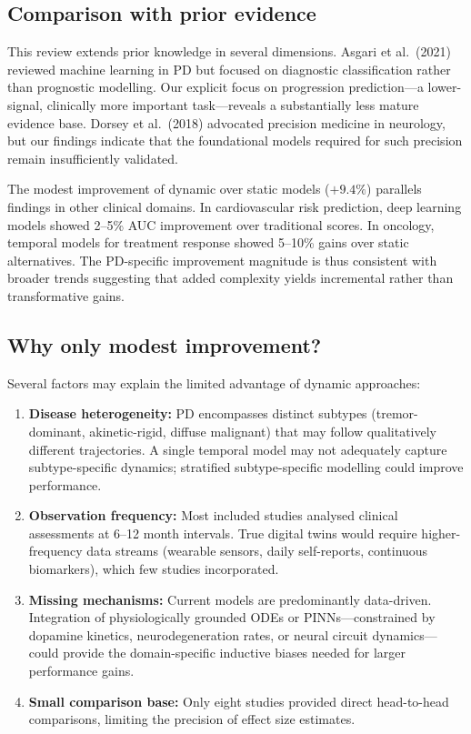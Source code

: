 \documentclass[11pt,a4paper]{article}
\begin{document}
\subsection{Comparison with prior evidence}

This review extends prior knowledge in several dimensions. Asgari et al.\ (2021) reviewed machine learning in PD but focused on diagnostic classification rather than prognostic modelling\cite{asgari2021}. Our explicit focus on progression prediction---a lower-signal, clinically more important task---reveals a substantially less mature evidence base. Dorsey et al.\ (2018) advocated precision medicine in neurology\cite{dorsey2018}, but our findings indicate that the foundational models required for such precision remain insufficiently validated.

The modest improvement of dynamic over static models ($+9.4\%$) parallels findings in other clinical domains. In cardiovascular risk prediction, deep learning models showed 2--5\% AUC improvement over traditional scores\cite{rajkomar2018}. In oncology, temporal models for treatment response showed 5--10\% gains over static alternatives\cite{topol2019}. The PD-specific improvement magnitude is thus consistent with broader trends suggesting that added complexity yields incremental rather than transformative gains.

\subsection{Why only modest improvement?}

Several factors may explain the limited advantage of dynamic approaches:

\begin{enumerate}[leftmargin=*]
    \item \textbf{Disease heterogeneity:} PD encompasses distinct subtypes (tremor-dominant, akinetic-rigid, diffuse malignant) that may follow qualitatively different trajectories\cite{fereshtehnejad2015}. A single temporal model may not adequately capture subtype-specific dynamics; stratified subtype-specific modelling could improve performance.
    \item \textbf{Observation frequency:} Most included studies analysed clinical assessments at 6--12 month intervals. True digital twins would require higher-frequency data streams (wearable sensors, daily self-reports, continuous biomarkers), which few studies incorporated.
    \item \textbf{Missing mechanisms:} Current models are predominantly data-driven. Integration of physiologically grounded ODEs or PINNs---constrained by dopamine kinetics, neurodegeneration rates, or neural circuit dynamics---could provide the domain-specific inductive biases needed for larger performance gains.
    \item \textbf{Small comparison base:} Only eight studies provided direct head-to-head comparisons, limiting the precision of effect size estimates.
\end{enumerate}
\end{document}
